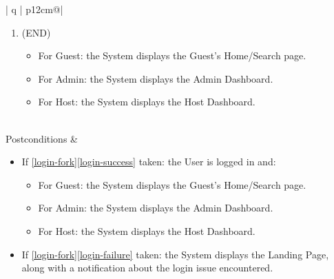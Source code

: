 \begin{table}[H]
\begin{tabular}{| q | p{12cm}@\qquad |}
\begin{enumerate}
            \item \label{login-end}(END)
            \begin{itemize}
                \item For Guest: the System displays the Guest's Home/Search page.
                \item For Admin: the System displays the Admin Dashboard.
                \item For Host: the System displays the Host Dashboard.
            \end{itemize}
            \vspace{-0.4cm}
        \end{enumerate}
        \\ \hline
        Postconditions &
        \vspace{-0.3cm}
        \begin{itemize}
            \item If \ref{login-fork}\ref{login-success} taken: the User is logged in and:
            \begin{itemize}
                \item For Guest: the System displays the Guest's Home/Search page.
                \item For Admin: the System displays the Admin Dashboard.
                \item For Host: the System displays the Host Dashboard.
            \end{itemize}
            \item If \ref{login-fork}\ref{login-failure} taken: the System displays the Landing Page, along with a notification about the login issue encountered.
            \vspace{-0.4cm}
        \end{itemize}
        \\ \hline
    \end{tabular}
    \caption{Use Case Snippet 1: Log in}
    \label{use_case_s1}
  \end{table}

